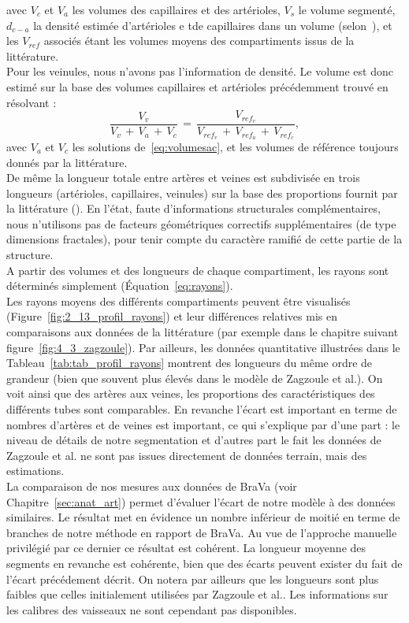 avec $V_c$ et $V_a$  les volumes des capillaires et des artérioles, $V_s$ le volume segmenté, $d_{c-a}$ la densité estimée d'artérioles e tde capillaires dans un volume (selon~\cite{Moody2004}), et les $V_{ref}$ associés étant les volumes moyens des compartiments issus de la littérature.\\
Pour les veinules, nous n’avons pas l’information de densité. Le volume est donc estimé sur la base des volumes capillaires et artérioles précédemment trouvé en résolvant : 
\begin{equation}
\frac{V_{v}}{V_v\,+\,V_a\,+\,V_c}\,=\,\frac{V_{ref_{v}}}{V_{ref_{v}}\,+\,V_{ref_{a}}\,+\,V_{ref_{c}}},
\end{equation}
avec $V_a$ et $V_c$ les solutions de~\ref{eq:volumesac}, et les volumes de référence toujours donnés par la littérature.\\
De même la longueur totale entre artères et veines est subdivisée en trois longueurs (artérioles, capillaires, veinules) sur la base des proportions fournit par la littérature (\cite{Zagzoule1986}). En l’état, faute d’informations structurales complémentaires, nous n’utilisons pas de facteurs géométriques correctifs supplémentaires (de type dimensions fractales), pour tenir compte du caractère ramifié de cette partie de la structure. \\
A partir des volumes et des longueurs de chaque compartiment, les rayons sont déterminés simplement (Équation~\ref{eq:rayons}). \\
Les rayons moyens des différents compartiments peuvent être visualisés (Figure~\ref{fig:2_13_profil_rayons}) et leur différences relatives mis en comparaisons aux données de la littérature (par exemple dans le chapitre suivant figure~\ref{fig:4_3_zagzoule}). Par ailleurs, les données quantitative illustrées dans le Tableau~\ref{tab:tab_profil_rayons} montrent des longueurs du même ordre de grandeur (bien que souvent plus élevés dans le modèle de Zagzoule et al.). On voit ainsi que des artères aux veines, les proportions des caractéristiques des différents tubes sont comparables. En revanche l'écart est important en terme de nombres d'artères et de veines est important, ce qui s'explique par d'une part : le niveau de détails de notre segmentation et d'autres part le fait les données de Zagzoule et al. ne sont pas issues directement de données terrain, mais des estimations.\\
 La comparaison de nos mesures aux données de BraVa (voir Chapitre~\ref{sec:anat_art}) permet d'évaluer l'écart de notre modèle à des données similaires. Le résultat met en évidence un nombre inférieur de moitié en terme de branches de notre méthode en rapport de BraVa. Au vue de l'approche manuelle privilégié par ce dernier ce résultat est cohérent. La longueur moyenne des segments en revanche est cohérente, bien que des écarts peuvent exister du fait de l'écart précédement décrit. On notera par ailleurs que les longueurs sont plus faibles que celles initialement utilisées par Zagzoule et al.. Les informations sur les calibres des vaisseaux ne sont cependant pas disponibles. \\

